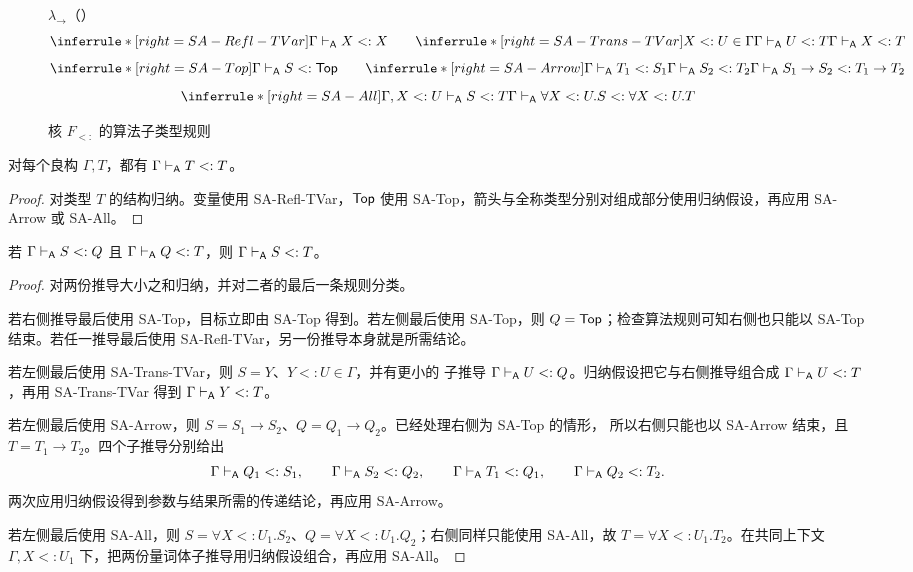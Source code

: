 \begin{figure}[!ht]
\centering
\begin{minipage}{0.96\linewidth}
  {\(\lambda_{\to}\)（）}
  {}
\[
\inferrule*[right=SA-Refl-TVar]{ }
 {\Gamma\algturnstile X<:X}
\qquad
\inferrule*[right=SA-Trans-TVar]
 {X<:U\in\Gamma\\\Gamma\algturnstile U<:T}
 {\Gamma\algturnstile X<:T}
\]
\[
\inferrule*[right=SA-Top]{ }
 {\Gamma\algturnstile S<:\tapltype{Top}}
\qquad
\inferrule*[right=SA-Arrow]
 {\Gamma\algturnstile T_1<:S_1\\
  \Gamma\algturnstile S_2<:T_2}
 {\Gamma\algturnstile S_1\to S_2<:T_1\to T_2}
\]
\[
\inferrule*[right=SA-All]
 {\Gamma,X<:U\algturnstile S<:T}
 {\Gamma\algturnstile
  \forall X<:U.S<:\forall X<:U.T}
\]
\end{minipage}
\caption{核 \(F_{<:}\) 的算法子类型规则}
\label{fig:28-3}
\end{figure}

\begin{lemma}[算法子类型关系的反身性]
\label{lem:28.3.1}
对每个良构 \(\Gamma,T\)，都有
\(\Gamma\mathrel{\vdash_{\mathsf A}} T<:T\)。
\end{lemma}

\begin{proof}
对类型 \(T\) 的结构归纳。变量使用 SA-Refl-TVar，\(\mathsf{Top}\) 使用
SA-Top，箭头与全称类型分别对组成部分使用归纳假设，再应用 SA-Arrow 或
SA-All。
\end{proof}

\begin{lemma}[算法子类型关系的传递性]
\label{lem:28.3.2}
若
\(\Gamma\mathrel{\vdash_{\mathsf A}} S<:Q\) 且
\(\Gamma\mathrel{\vdash_{\mathsf A}} Q<:T\)，则
\(\Gamma\mathrel{\vdash_{\mathsf A}} S<:T\)。
\end{lemma}

\begin{proof}
对两份推导大小之和归纳，并对二者的最后一条规则分类。

若右侧推导最后使用 SA-Top，目标立即由 SA-Top 得到。若左侧最后使用
SA-Top，则 \(Q=\mathsf{Top}\)；检查算法规则可知右侧也只能以 SA-Top
结束。若任一推导最后使用 SA-Refl-TVar，另一份推导本身就是所需结论。

若左侧最后使用 SA-Trans-TVar，则 \(S=Y\)、\(Y<:U\in\Gamma\)，并有更小的
子推导 \(\Gamma\mathrel{\vdash_{\mathsf A}} U<:Q\)。归纳假设把它与右侧推导组合成
\(\Gamma\mathrel{\vdash_{\mathsf A}} U<:T\)，再用 SA-Trans-TVar 得到
\(\Gamma\mathrel{\vdash_{\mathsf A}} Y<:T\)。

若左侧最后使用 SA-Arrow，则
\(S=S_1\to S_2\)、\(Q=Q_1\to Q_2\)。已经处理右侧为 SA-Top 的情形，
所以右侧只能也以 SA-Arrow 结束，且 \(T=T_1\to T_2\)。四个子推导分别给出
\[
\Gamma\mathrel{\vdash_{\mathsf A}} Q_1<:S_1,\qquad
\Gamma\mathrel{\vdash_{\mathsf A}} S_2<:Q_2,\qquad
\Gamma\mathrel{\vdash_{\mathsf A}} T_1<:Q_1,\qquad
\Gamma\mathrel{\vdash_{\mathsf A}} Q_2<:T_2.
\]
两次应用归纳假设得到参数与结果所需的传递结论，再应用 SA-Arrow。

若左侧最后使用 SA-All，则
\(S=\forall X<:U_1.S_2\)、\(Q=\forall X<:U_1.Q_2\)；右侧同样只能使用
SA-All，故 \(T=\forall X<:U_1.T_2\)。在共同上下文
\(\Gamma,X<:U_1\) 下，把两份量词体子推导用归纳假设组合，再应用 SA-All。
\end{proof}

